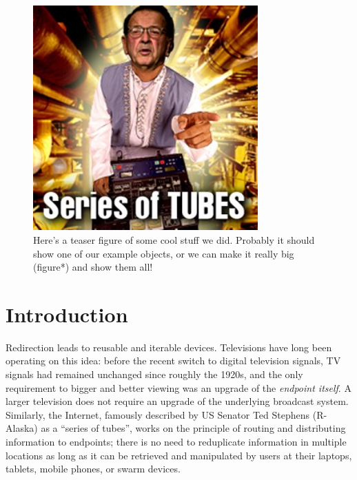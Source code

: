 \begin{figure}[h]
\centering
    \includegraphics[width=3.4in]{figures/series-of-tubes.jpg}
\caption{Here's a teaser figure of some cool stuff we did. Probably it should show one of our example objects, or we can make it really big (figure*) and show them all!}
\label{fig:teaser}
\end{figure}

\section{Introduction}


Redirection leads to reusable and iterable devices.  Televisions have long been operating on this idea: before the recent switch to digital television signals, TV signals had remained unchanged since roughly the 1920s, and the only requirement to bigger and better viewing was an upgrade of the \emph{endpoint itself}.  A larger television does not require an upgrade of the underlying broadcast system.  Similarly, the Internet, famously described by US Senator Ted Stephens (R-Alaska) as a ``series of tubes'', works on the principle of routing and distributing information to endpoints; there is no need to reduplicate information in multiple locations as long as it can be retrieved and manipulated by users at their laptops, tablets, mobile phones, or swarm devices. 

